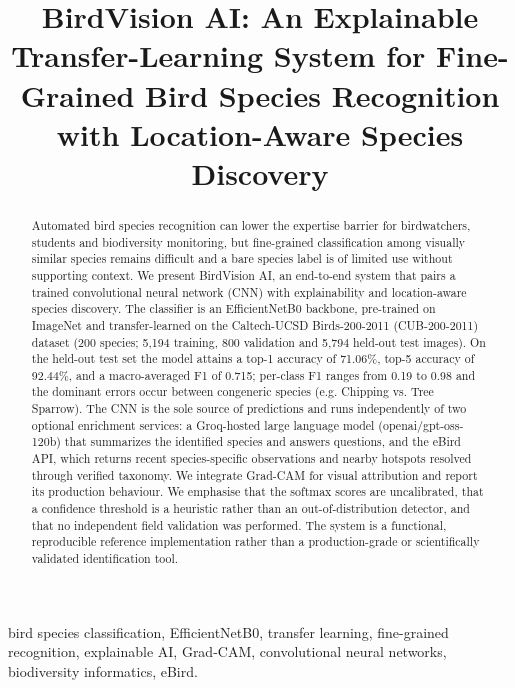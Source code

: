 \documentclass[conference]{IEEEtran}
\begin{document}
\title{BirdVision AI: An Explainable Transfer-Learning System for Fine-Grained Bird Species Recognition with Location-Aware Species Discovery}
\author{}
\maketitle
\begin{abstract}
Automated bird species recognition can lower the expertise barrier for birdwatchers, students and biodiversity monitoring, but fine-grained classification among visually similar species remains difficult and a bare species label is of limited use without supporting context. We present BirdVision AI, an end-to-end system that pairs a trained convolutional neural network (CNN) with explainability and location-aware species discovery. The classifier is an EfficientNetB0 backbone, pre-trained on ImageNet and transfer-learned on the Caltech-UCSD Birds-200-2011 (CUB-200-2011) dataset (200 species; 5,194 training, 800 validation and 5,794 held-out test images). On the held-out test set the model attains a top-1 accuracy of 71.06\%, top-5 accuracy of 92.44\%, and a macro-averaged F1 of 0.715; per-class F1 ranges from 0.19 to 0.98 and the dominant errors occur between congeneric species (e.g. Chipping vs. Tree Sparrow). The CNN is the sole source of predictions and runs independently of two optional enrichment services: a Groq-hosted large language model (openai/gpt-oss-120b) that summarizes the identified species and answers questions, and the eBird API, which returns recent species-specific observations and nearby hotspots resolved through verified taxonomy. We integrate Grad-CAM for visual attribution and report its production behaviour. We emphasise that the softmax scores are uncalibrated, that a confidence threshold is a heuristic rather than an out-of-distribution detector, and that no independent field validation was performed. The system is a functional, reproducible reference implementation rather than a production-grade or scientifically validated identification tool.
\end{abstract}
\begin{IEEEkeywords}
bird species classification, EfficientNetB0, transfer learning, fine-grained recognition, explainable AI, Grad-CAM, convolutional neural networks, biodiversity informatics, eBird.
\end{IEEEkeywords}
\end{document}
